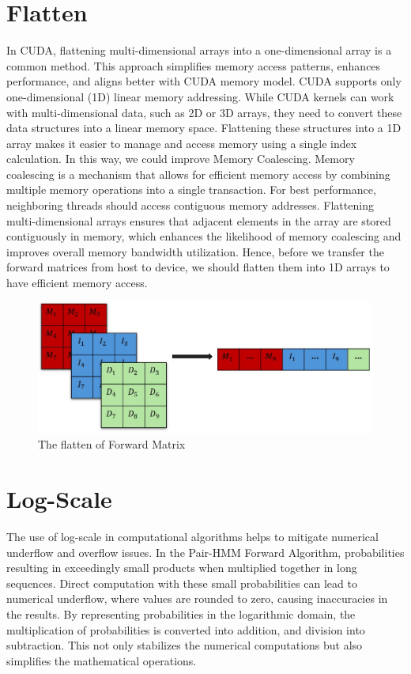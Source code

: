 \documentclass[PhD]{PHlab-thesis}
\begin{document}
\section{Flatten}
In CUDA, flattening multi-dimensional arrays into a one-dimensional array is a common method. This approach simplifies memory access patterns, enhances performance, and aligns better with CUDA memory model. CUDA supports only one-dimensional (1D) linear memory addressing. While CUDA kernels can work with multi-dimensional data, such as 2D or 3D arrays, they need to convert these data structures into a linear memory space. Flattening these structures into a 1D array makes it easier to manage and access memory using a single index calculation. In this way, we could improve Memory Coalescing. Memory coalescing is a mechanism that allows for efficient memory access by combining multiple memory operations into a single transaction. For best performance, neighboring threads should access contiguous memory addresses. Flattening multi-dimensional arrays ensures that adjacent elements in the array are stored contiguously in memory, which enhances the likelihood of memory coalescing and improves overall memory bandwidth utilization. Hence, before we transfer the forward matrices from host to device, we should flatten them into 1D arrays to have efficient memory access.

\begin{figure}[h]
    \centering
    \includegraphics[width=1\linewidth]{figure/Flatten.jpg}
    \caption{The flatten of Forward Matrix}
    \label{fig:flatten}
\end{figure}


\section{Log-Scale}
The use of log-scale in computational algorithms helps to mitigate numerical underflow and overflow issues. In the Pair-HMM Forward Algorithm, probabilities resulting in exceedingly small products when multiplied together in long sequences. Direct computation with these small probabilities can lead to numerical underflow, where values are rounded to zero, causing inaccuracies in the results. By representing probabilities in the logarithmic domain, the multiplication of probabilities is converted into addition, and division into subtraction. This not only stabilizes the numerical computations but also simplifies the mathematical operations.
\end{document}
